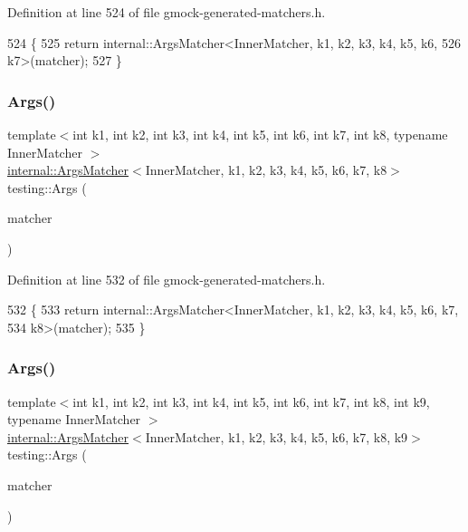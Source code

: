 Definition at line 524 of file gmock-\/generated-\/matchers.\+h.


\begin{DoxyCode}
524                                   \{
525   \textcolor{keywordflow}{return} internal::ArgsMatcher<InnerMatcher, k1, k2, k3, k4, k5, k6,
526       k7>(matcher);
527 \}
\end{DoxyCode}
\mbox{\label{namespacetesting_ae8a4e8e1b8eb87c9f1e5f02519da7fce}} 
\subsubsection{\texorpdfstring{Args()}{Args()}\hspace{0.1cm}{\footnotesize\ttfamily [9/11]}}
{\footnotesize\ttfamily template$<$int k1, int k2, int k3, int k4, int k5, int k6, int k7, int k8, typename Inner\+Matcher $>$ \\
\hyperlink{classtesting_1_1internal_1_1ArgsMatcher}{internal\+::\+Args\+Matcher}$<$Inner\+Matcher, k1, k2, k3, k4, k5, k6, k7, k8$>$ testing\+::\+Args (\begin{DoxyParamCaption}\item[{const Inner\+Matcher \&}]{matcher }\end{DoxyParamCaption})\hspace{0.3cm}{\ttfamily [inline]}}



Definition at line 532 of file gmock-\/generated-\/matchers.\+h.


\begin{DoxyCode}
532                                   \{
533   \textcolor{keywordflow}{return} internal::ArgsMatcher<InnerMatcher, k1, k2, k3, k4, k5, k6, k7,
534       k8>(matcher);
535 \}
\end{DoxyCode}
\mbox{\label{namespacetesting_a62c877e01fb9098cd3c399f921bf4e3e}} 
\subsubsection{\texorpdfstring{Args()}{Args()}\hspace{0.1cm}{\footnotesize\ttfamily [10/11]}}
{\footnotesize\ttfamily template$<$int k1, int k2, int k3, int k4, int k5, int k6, int k7, int k8, int k9, typename Inner\+Matcher $>$ \\
\hyperlink{classtesting_1_1internal_1_1ArgsMatcher}{internal\+::\+Args\+Matcher}$<$Inner\+Matcher, k1, k2, k3, k4, k5, k6, k7, k8, k9$>$ testing\+::\+Args (\begin{DoxyParamCaption}\item[{const Inner\+Matcher \&}]{matcher }\end{DoxyParamCaption})\hspace{0.3cm}{\ttfamily [inline]}}



